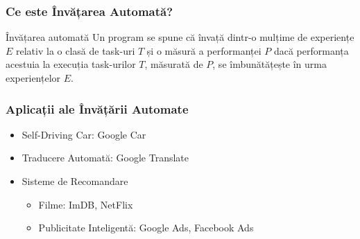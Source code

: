 \begin{frame}
  \frametitle{Ce este Învățarea Automată?}
  \begin{block}{Învățarea automată}
    Un program se spune că învață dintr-o mulțime de experiențe $E$
    relativ la o clasă de task-uri $T$ și o măsură a performanței $P$
    dacă performanța acestuia la execuția task-urilor $T$, măsurată de $P$,
    se îmbunătățește în urma experiențelor $E$.
    \citep{Mitchell:1997:ML:541177}
  \end{block}
\end{frame}

\begin{frame}[t]
  \frametitle{Aplicații ale Învățării Automate}
  \begin{itemize}
  \item \alert<1>{Self-Driving Car: Google Car}
  \item \alert<2>{Traducere Automată: Google Translate}
  \item \alert<3->{Sisteme de Recomandare}
    \begin{itemize}
    \item \alert<3>{Filme: ImDB, NetFlix}
    \item \alert<4>{Publicitate Inteligentă: Google Ads, Facebook Ads}
    \end{itemize}
  \end{itemize}
  \begin{center}%

\end{center}
\end{frame}
